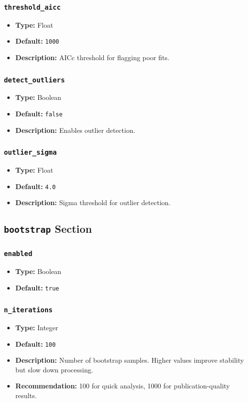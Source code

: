 \documentclass[12pt,a4paper]{article}
\begin{document}
\subsubsection{\texttt{threshold\_aicc}}
\begin{itemize}[leftmargin=*]
    \item \textbf{Type:} Float
    \item \textbf{Default:} \texttt{1000}
    \item \textbf{Description:} AICc threshold for flagging poor fits.
\end{itemize}
\subsubsection{\texttt{detect\_outliers}}
\begin{itemize}[leftmargin=*]
    \item \textbf{Type:} Boolean
    \item \textbf{Default:} \texttt{false}
    \item \textbf{Description:} Enables outlier detection.
\end{itemize}
\subsubsection{\texttt{outlier\_sigma}}
\begin{itemize}[leftmargin=*]
    \item \textbf{Type:} Float
    \item \textbf{Default:} \texttt{4.0}
    \item \textbf{Description:} Sigma threshold for outlier detection.
\end{itemize}

\subsection{\texttt{bootstrap} Section}
\subsubsection{\texttt{enabled}}
\begin{itemize}[leftmargin=*]
    \item \textbf{Type:} Boolean
    \item \textbf{Default:} \texttt{true}
\end{itemize}
\subsubsection{\texttt{n\_iterations}}
\begin{itemize}[leftmargin=*]
    \item \textbf{Type:} Integer
    \item \textbf{Default:} \texttt{100}
    \item \textbf{Description:} Number of bootstrap samples. Higher values improve stability but slow down processing.
    \item \textbf{Recommendation:} 100 for quick analysis, 1000 for publication-quality results.
\end{itemize}
\end{document}

